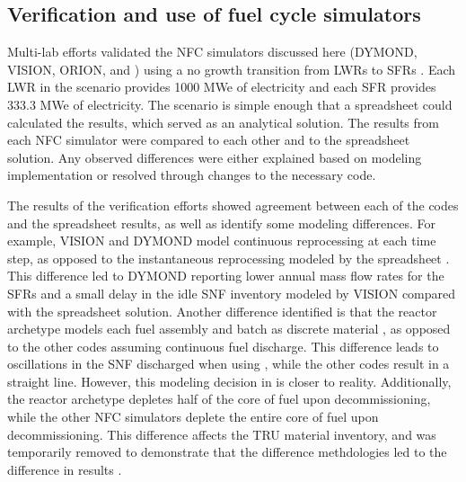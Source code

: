 \subsection{Verification and use of fuel cycle simulators}
Multi-lab efforts validated the \gls{NFC} simulators discussed here 
(\gls{DYMOND}, \gls{VISION}, ORION, and \Cyclus)
using a no growth transition from \glspl{LWR} 
to \glspl{SFR} \cite{feng_sensitivity_2020,bae_standardized_2019}.
Each \gls{LWR} in the scenario provides 1000 MWe of 
electricity and each \gls{SFR} provides 333.3 MWe of electricity. The 
scenario is simple enough that a spreadsheet could calculated the results, 
which served as an analytical solution. The 
results from each \gls{NFC} simulator were compared to each other and 
to the spreadsheet solution. Any observed differences were either explained 
based on modeling implementation or resolved through changes to the 
necessary code.

The results of the verification efforts showed agreement between each 
of the codes and the spreadsheet results, as well as identify some modeling 
differences. For example, \gls{VISION} and \gls{DYMOND} model continuous 
reprocessing at each time step, as opposed to the instantaneous 
reprocessing modeled by the spreadsheet \cite{feng_standardized_2016}. 
This difference led to \gls{DYMOND} reporting lower annual mass flow 
rates for the \glspl{SFR} and a small delay in the idle \gls{SNF} 
inventory modeled by \gls{VISION} compared with the spreadsheet 
solution. 
Another difference identified is that the \Cycamore reactor 
archetype models each fuel assembly and batch as discrete material 
\cite{bae_standardized_2019}, as 
opposed to the other codes assuming continuous fuel discharge. 
This difference leads to oscillations in the \gls{SNF} discharged 
when using \Cyclus, while the other codes result in a straight line.
However, this modeling decision in \Cyclus is closer to reality. 
Additionally, the \Cycamore reactor archetype depletes half of the 
core of fuel upon decommissioning, while the other \gls{NFC} simulators 
deplete the entire core of fuel upon decommissioning. This 
difference affects the \gls{TRU} material inventory, and was 
temporarily removed to demonstrate that the difference 
methdologies led to the difference in results \cite{bae_standardized_2019}.

